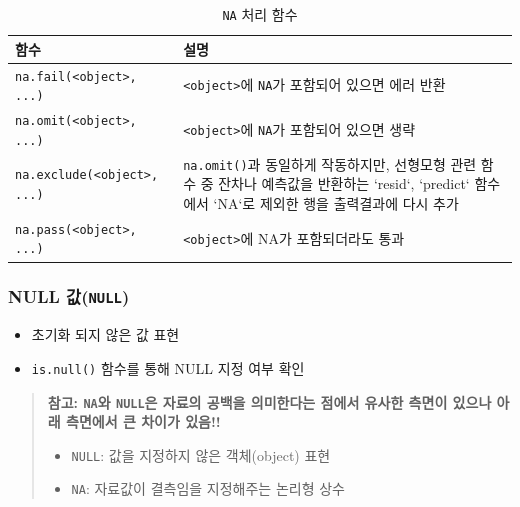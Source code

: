 \documentclass[11pt,a4paper]{book}
\providecommand{\tightlist}{%
  \setlength{\itemsep}{0pt}\setlength{\parskip}{0pt}}
\theoremstyle{definition}
\theoremstyle{definition}
\theoremstyle{definition}
\theoremstyle{remark}
\begin{document}
\begin{table}[H]
  \centering
  \begingroup\footnotesize
  \caption{\texttt{NA} 처리 함수}
  \begin{tabular}{p{5cm}p{9cm}}
  \toprule
  \textbf{함수} & \textbf{설명} \\
  \midrule
  \texttt{na.fail(<object>, ...)} & \texttt{<object>}에 \texttt{NA}가 포함되어 있으면 에러 반환 \\
  \texttt{na.omit(<object>, ...)} & \texttt{<object>}에 \texttt{NA}가 포함되어 있으면 생략 \\
  \texttt{na.exclude(<object>, ...)} & \texttt{na.omit()}과 동일하게 작동하지만, 선형모형 관련 함수 중 잔차나 예측값을 반환하는  `resid`, `predict` 함수에서 `NA`로 제외한 행을 출력결과에 다시 추가 \\
  \texttt{na.pass(<object>, ...)} & \texttt{<object>}에 NA가 포함되더라도 통과 \\
  \bottomrule
  \end{tabular}
  \endgroup
\end{table}

\subsubsection{\texorpdfstring{NULL
값(\texttt{NULL})}{NULL 값(NULL)}}\label{null-null}

\begin{itemize}
\tightlist
\item
  초기화 되지 않은 값 표현
\item
  \texttt{is.null()} 함수를 통해 NULL 지정 여부 확인
\end{itemize}

\begin{quote}
\colorbox{gray!10}{\begin{minipage}{15cm}
\textbf{참고: \texttt{NA}와 \texttt{NULL}은 자료의 공백을 의미한다는 점에서 유사한 측면이 있으나 아래 측면에서 큰 차이가 있음!!}
\begin{itemize}
  \item \texttt{NULL}: 값을 지정하지 않은 객체(object) 표현
  \item \texttt{NA}: 자료값이 결측임을 지정해주는 논리형 상수
\end{itemize}
\end{minipage}}
\end{quote}

\vspace{0.5cm}

\footnotesize
\end{document}
